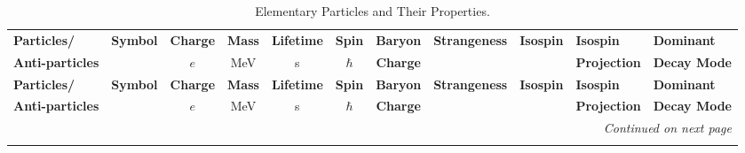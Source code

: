 \documentclass[fontsize=9pt,twoside]{scrbook}
\begin{document}
\setcounter{page}{994}

\renewcommand{\arraystretch}{1.25}  %

\begin{small}
\begin{center}
\begin{longtable}{p{3cm}ccccccccp{1.75cm}p{2.75cm}}
\caption{Elementary Particles and Their Properties.} \label{tab:particles} \\
\toprule
\textbf{Particles/} & \textbf{Symbol} & \textbf{Charge} & \textbf{Mass} & \textbf{Lifetime} & \textbf{Spin} & \textbf{Baryon} & \textbf{Strangeness} & \textbf{Isospin} & \textbf{Isospin} & \textbf{Dominant} \\
\textbf{Anti-particles} &  & $e$ & MeV & s & $\hbar$ & \textbf{Charge} & & & \textbf{Projection} & \textbf{Decay Mode} \\
\midrule
\endfirsthead

\toprule
\textbf{Particles/} & \textbf{Symbol} & \textbf{Charge} & \textbf{Mass} & \textbf{Lifetime} & \textbf{Spin} & \textbf{Baryon} & \textbf{Strangeness} & \textbf{Isospin} & \textbf{Isospin} & \textbf{Dominant} \\
\textbf{Anti-particles} &  & $e$ & MeV & s & $\hbar$ & \textbf{Charge} & & & \textbf{Projection} & \textbf{Decay Mode} \\
\midrule
\endhead

\midrule
\multicolumn{11}{r}{\textit{Continued on next page}} \\
\midrule
\endfoot


\end{longtable}
\end{center}
\end{small}
\end{document}
